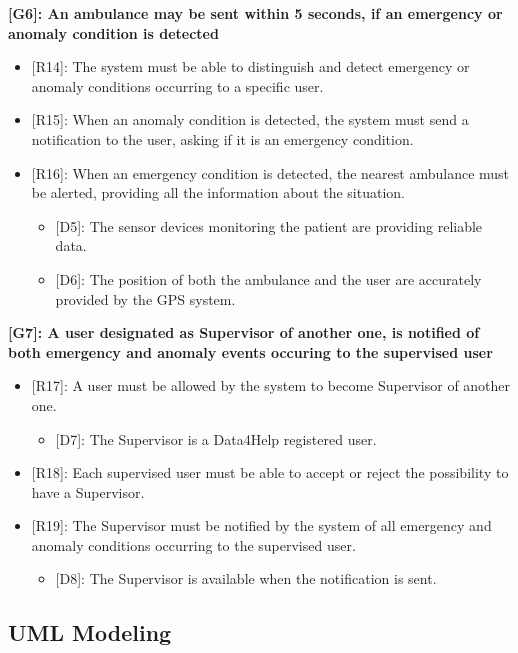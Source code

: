 \textbf{[G6]: An ambulance may be sent within 5 seconds, if an emergency or anomaly condition is detected}

\begin{itemize}
	\item {[R14]: The system must be able to distinguish and detect emergency or anomaly conditions occurring to a specific user.}
	\item {[R15]: When an anomaly condition is detected, the system must send a notification to the user, asking if it is an emergency condition.}
	\item {[R16]: When an emergency condition is detected, the nearest ambulance must be alerted, providing all the information about the situation.}
	\begin{itemize}
		\item {[D5]: The sensor devices monitoring the patient are providing reliable data.}
		\item {[D6]: The position of both the ambulance and the user are accurately provided by the GPS system.}
	\end{itemize}
\end{itemize}

\textbf{[G7]: A user designated as Supervisor of another one, is notified of both emergency and anomaly events occuring to the supervised user}

\begin{itemize}[itemsep=0em]
	\item {[R17]: A user must be allowed by the system to become Supervisor of another one.}
	\begin{itemize}
		\item {[D7]: The Supervisor is a Data4Help registered user.}
	\end{itemize}
	\item {[R18]: Each supervised user must be able to accept or reject the possibility to have a Supervisor.}
	\item {[R19]: The Supervisor must be notified by the system of all emergency and anomaly conditions occurring to the supervised user.}
	\begin{itemize}[topsep=0em]
		\item {[D8]: The Supervisor is available when the notification is sent.}
	\end{itemize}
\end{itemize}

{\color{Blue}\subsection{UML Modeling}}


